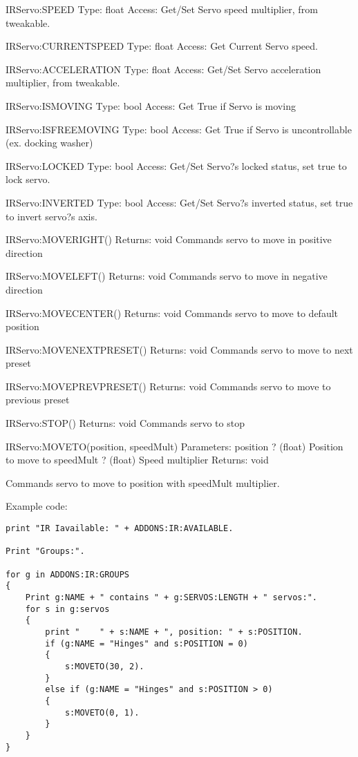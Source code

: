 IRServo:SPEED
Type:	float
Access:	Get/Set
Servo speed multiplier, from tweakable.

IRServo:CURRENTSPEED
Type:	float
Access:	Get
Current Servo speed.

IRServo:ACCELERATION
Type:	float
Access:	Get/Set
Servo acceleration multiplier, from tweakable.

IRServo:ISMOVING
Type:	bool
Access:	Get
True if Servo is moving

IRServo:ISFREEMOVING
Type:	bool
Access:	Get
True if Servo is uncontrollable (ex. docking washer)

IRServo:LOCKED
Type:	bool
Access:	Get/Set
Servo?s locked status, set true to lock servo.

IRServo:INVERTED
Type:	bool
Access:	Get/Set
Servo?s inverted status, set true to invert servo?s axis.

IRServo:MOVERIGHT()
Returns:	void
Commands servo to move in positive direction

IRServo:MOVELEFT()
Returns:	void
Commands servo to move in negative direction

IRServo:MOVECENTER()
Returns:	void
Commands servo to move to default position

IRServo:MOVENEXTPRESET()
Returns:	void
Commands servo to move to next preset

IRServo:MOVEPREVPRESET()
Returns:	void
Commands servo to move to previous preset

IRServo:STOP()
Returns:	void
Commands servo to stop

IRServo:MOVETO(position, speedMult)
Parameters:	
position ? (float) Position to move to
speedMult ? (float) Speed multiplier
Returns:	
void

Commands servo to move to position with speedMult multiplier.

Example code:

\begin{Verbatim}[frame=single]
print "IR Iavailable: " + ADDONS:IR:AVAILABLE.

Print "Groups:".

for g in ADDONS:IR:GROUPS
{
    Print g:NAME + " contains " + g:SERVOS:LENGTH + " servos:".
    for s in g:servos
    {
        print "    " + s:NAME + ", position: " + s:POSITION.
        if (g:NAME = "Hinges" and s:POSITION = 0)
        {
            s:MOVETO(30, 2).
        }
        else if (g:NAME = "Hinges" and s:POSITION > 0)
        {
            s:MOVETO(0, 1).
        }
    }
}
\end{Verbatim}